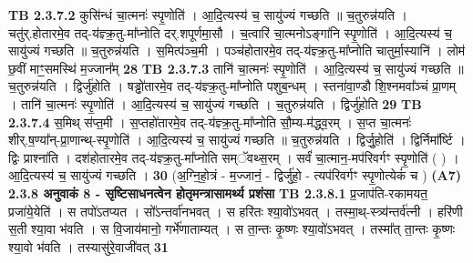 \documentclass[17pt]{extarticle}
\begin{document}
                  \newline
                                \textbf{ TB 2.3.7.2} \newline
                  कुसि॑न्धं चा॒त्मनः॑ स्पृ॒णोति॑ । आ॒दि॒त्यस्य॑ च॒ सायु॑ज्यं गच्छति ॥ च॒तुरुन्न॑यति । चतु॑र्.होतारमे॒व तद्-य॑ज्ञ्क्र॒तु-मा᳚प्नोति दर्.शपूर्णमा॒सौ । च॒त्वारि॑ चा॒त्मनोऽङ्गा॑नि स्पृ॒णोति॑ । आ॒दि॒त्यस्य॑ च॒ सायु॑ज्यं गच्छति ॥ च॒तुरुन्न॑यति । स॒मित्प॑ञ्च॒मी । पञ्च॑होतारमे॒व तद्-य॑ज्ञ्क्र॒तु-मा᳚प्नोति चातुर्मा॒स्यानि॑ । लोम॑ छ॒वीं माꣳ॒॒समस्थि॑ म॒ज्जान᳚म् \textbf{ 28} \newline
                  \newline
                                \textbf{ TB 2.3.7.3} \newline
                  तानि॑ चा॒त्मनः॑ स्पृ॒णोति॑ । आ॒दि॒त्यस्य॑ च॒ सायु॑ज्यं गच्छति ॥ च॒तुरुन्न॑यति । द्विर्जु॑होति । षड्ढो॑तारमे॒व तद्-य॑ज्ञ्क्र॒तु-मा᳚प्नोति पशुब॒न्धम् । स्तना॑वा॒ण्डौ शि॒श्नमवा᳚ञ्चं प्रा॒णम् । तानि॑ चा॒त्मनः॑ स्पृ॒णोति॑ । आ॒दि॒त्यस्य॑ च॒ सायु॑ज्यं गच्छति । च॒तुरुन्न॑यति । द्विर्जु॑होति \textbf{ 29} \newline
                  \newline
                                \textbf{ TB 2.3.7.4} \newline
                  स॒मिथ् स॑प्त॒मी । स॒प्तहो॑तारमे॒व तद्-य॑ज्ञ्क्र॒तु-मा᳚प्नोति सौ॒म्य-म॑द्ध्व॒रम् । स॒प्त चा॒त्मनः॑ शीर्.ष॒ण्या᳚न्-प्रा॒णान्थ्-स्पृ॒णोति॑ । आ॒दि॒त्यस्य॑ च॒ सायु॑ज्यं गच्छति ॥ च॒तुरुन्न॑यति । द्विर्जु॒होति॑ । द्विर्निमा᳚र्ष्टि । द्विः प्राश्ना॑ति । दश॑होतारमे॒व तद्-य॑ज्ञ्क्र॒तु-मा᳚प्नोति सम्ॅवथ्स॒रम् । सर्वं॑ चा॒त्मान॒-मप॑रिवर्गꣳ स्पृ॒णोति॑ ( ) । आ॒दि॒त्यस्य॑ च॒ सायु॑ज्यं गच्छति । \textbf{ 30} \newline
                  \newline
                                    (अ॒ग्नि॒हो॒त्रं - म॒ज्जानं॒ - द्विर्जु॑हो॒ - त्यप॑रिवर्गꣳ स्पृ॒णोत्येकं॑ च ) \textbf{(A7)} \newline \newline
                \textbf{ 2.3.8      अनुवाकं   8 - सृष्टिसाधनत्वेन होतृमन्त्रासामर्थ्य प्रशंसा} \newline
                                \textbf{ TB 2.3.8.1} \newline
                  [(अप॑क्रामत गर्भि॒ण्यः) इस् ओन्ल्य् इन्स्त्रुच्तिओन् , नोत् अ मन्त्र]प्र॒जाप॑ति-रकामयत॒ प्रजा॑ये॒येति॑ । स तपो॑ऽतप्यत । सो᳚ऽन्तर्वा॑नभवत् । स हरि॑तः श्या॒वो॑ऽभवत् । तस्मा॒थ्-स्त्र्य॑न्तर्व॑त्नी । हरि॑णी स॒ती श्या॒वा भ॑वति । स वि॒जाय॑मानो॒ गर्भे॑णाताम्यत् । स ता॒न्तः कृ॒ष्णः श्या॒वो॑ऽभवत् । तस्मा᳚त् ता॒न्तः कृ॒ष्णः श्या॒वो भ॑वति । तस्यासु॑रे॒वाजी॑वत् \textbf{ 31} \newline
\end{document}

